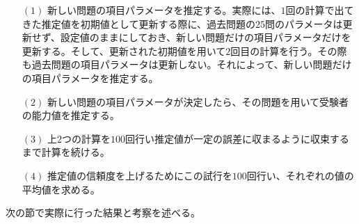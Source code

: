 \documentclass[12pt]{jarticle}
\numberwithin{equation}{subsection}
\begin{document}
\begin{itemize}
  \item[$(1)$] 新しい問題の項目パラメータを推定する。実際には、$1$回の計算で出てきた推定値を初期値として更新する際に、過去問題の$25$問のパラメータは更新せず、設定値のままにしておき、新しい問題だけの項目パラメータだけを更新する。そして、更新された初期値を用いて$2$回目の計算を行う。その際も過去問題の項目パラメータは更新しない。それによって、新しい問題だけの項目パラメータを推定する。
  \item[$(2)$] 新しい問題の項目パラメータが決定したら、その問題を用いて受験者の能力値を推定する。
  \item[$(3)$]上$2$つの計算を$100$回行い推定値が一定の誤差に収まるように収束するまで計算を続ける。
  \item[$(4)$] 推定値の信頼度を上げるためにこの試行を$100$回行い、それぞれの値の平均値を求める。
\end{itemize}
次の節で実際に行った結果と考察を述べる。
\end{document}

